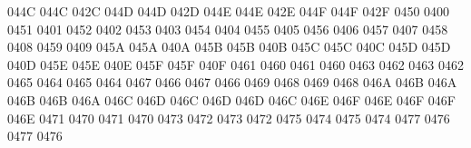 \setcclcuc 044C 044C 042C %
\setcclcuc 044D 044D 042D %
\setcclcuc 044E 044E 042E %
\setcclcuc 044F 044F 042F %
 0450 0400 %
 0451 0401 %
 0452 0402 %
 0453 0403 %
 0454 0404 %
 0455 0405 %
 0456 0406 %
 0457 0407 %
 0458 0408 %
 0459 0409 %
\setcclcuc 045A 045A 040A %
\setcclcuc 045B 045B 040B %
\setcclcuc 045C 045C 040C %
\setcclcuc 045D 045D 040D %
\setcclcuc 045E 045E 040E %
\setcclcuc 045F 045F 040F %
 0461 0460 %
 0461 0460 %
 0463 0462 %
 0463 0462 %
 0465 0464 %
 0465 0464 %
 0467 0466 %
 0467 0466 %
 0469 0468 %
 0469 0468 %
\setcclcuc 046A 046B 046A %
\setcclcuc 046B 046B 046A %
\setcclcuc 046C 046D 046C %
\setcclcuc 046D 046D 046C %
\setcclcuc 046E 046F 046E %
\setcclcuc 046F 046F 046E %
 0471 0470 %
 0471 0470 %
 0473 0472 %
 0473 0472 %
 0475 0474 %
 0475 0474 %
 0477 0476 %
 0477 0476 %
